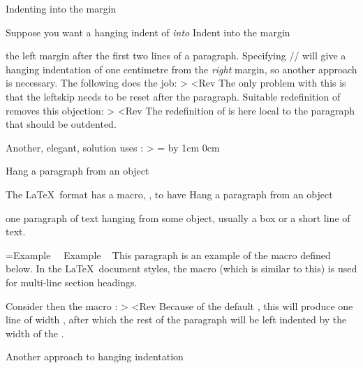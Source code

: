 \spoint Indenting into the margin

Suppose you want a hanging indent of \n{1cm} {\sl into\/}
\howto Indent into the margin\par
the left margin after the first two lines of a paragraph. 
Specifying \ver/\hangindent=-1cm/ will give
a hanging indentation of one centimetre from the {\sl right\/}
margin, so another approach is necessary. The following does the
job:
\Ver> \leftskip=-1cm \hangindent=1cm <Rev
The only problem with this is that
the leftskip needs to be reset after the paragraph.
Suitable redefinition of  removes this objection:
\Ver>
\def\hangintomargin{\bgroup
    \leftskip=-1cm \hangindent=1cm \hangafter=-2
    \def\par{\endgraf\egroup}}<Rev
The redefinition of  is here local to the paragraph that
should be outdented.

Another, elegant, solution uses :
\Ver> 
=\hsize \advance{} by 1cm
    0cm\hsize      %
    0cm\hsize      %
    -1cm    %

\spoint Hang a paragraph from an object

The \LaTeX\ format has a macro, , to have
\howto Hang a paragraph from an object\par
one paragraph of text hanging from some object, usually a box
or a short line of text. 

\begingroup
\medskip
\def\hangobject{Example \ }
=\hbox{\hangobject}
\hangindent {} \noindent \hangobject
This paragraph is an example of the  macro
defined below.
In the \LaTeX\ document
styles, the  macro (which is similar to this)
is used for multi-line section headings.\par
\endgroup

Consider then the macro :
\Ver> 
\def\hangfrom#1{\def\hangobject{#1}\setbox0=\hbox{\hangobject}%
    \hangindent \wd0 \noindent \hangobject \ignorespaces}<Rev
Because of the default , this 
will produce one line of width , after which the
rest of the paragraph will be left indented  by the width of the
.

\spoint Another approach to hanging indentation

